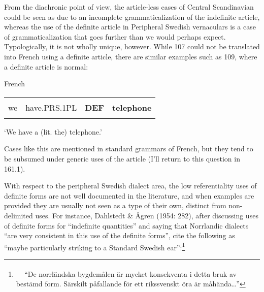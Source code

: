 \begin{styleBodytextC}
From the diachronic point of view, the article-less cases of Central Scandinavian could be seen as due to an incomplete grammaticalization of the indefinite article, whereas the use of the definite article in Peripheral Swedish vernaculars is a case of grammaticalization that goes further than we would perhaps expect. Typologically, it is not wholly unique, however. While 107 could not be translated into French using a definite article, there are similar examples such as 109, where a definite article is normal:

\end{styleBodytextC}

\begin{listWWNumileveli}
\item 

\begin{styleExample}
\label{bkm:Ref224102943}French

\end{styleExample}

\end{listWWNumileveli}

\begin{tabular}{llll}
\lsptoprule
\multicolumn{4}{l}{Nous

}\\
we & have.PRS.1PL & {\bfseries DEF} & {\bfseries telephone}\\
\lspbottomrule
\end{tabular}

\begin{styleTranslation}
‘We have a (lit. the) telephone.’

\end{styleTranslation}

\begin{styleBodyTextFirst}
Cases like this are mentioned in standard grammars of French, but they tend to be subsumed under generic uses of the article (I’ll return to this question in 161.1). 

\end{styleBodyTextFirst}

\begin{styleBodytextC}
With respect to the peripheral Swedish dialect area, the low referentiality uses of definite forms are not well documented in the literature, and when examples are provided they are usually not seen as a type of their own, distinct from non-delimited uses. For instance, Dahlstedt \& Ågren (1954: 282), after discussing uses of definite forms for “indefinite quantities” and saying that Norrlandic dialects “are very consistent in this use of the definite forms”, cite the following as “maybe particularly striking to a Standard Swedish ear”:\footnote{\textsuperscript{\ \ } “De norrländska bygdemålen är mycket konsekventa i detta bruk av bestämd form. Särskilt påfallande för ett rikssvenskt öra är måhända…”} 

\end{styleBodytextC}

